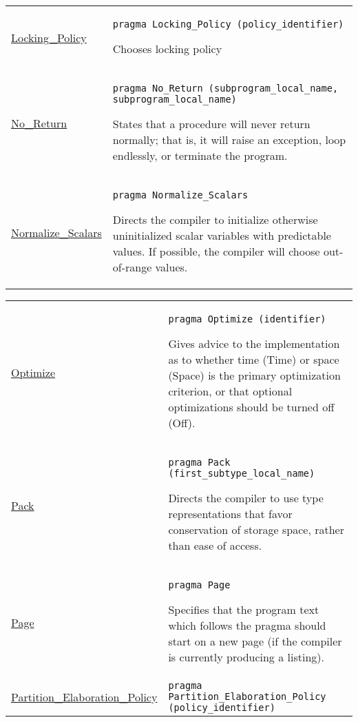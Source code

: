 \documentclass[english]{article}
\begin{document}
\begin{scriptsize}
\begin{multicols*}{3}
\begin{tabular}{@{}p{2cm}p{6.5cm}}
   \href{http://www.ada-auth.org/standards/22rm/html/RM-D-3.html}{Locking\_Policy} & \texttt{pragma Locking\_Policy (policy\_identifier)}

   Chooses locking policy\\

   \href{http://www.ada-auth.org/standards/22rm/html/RM-J-15-2.html}{No\_Return} & \texttt{pragma No\_Return (subprogram\_local\_name{, subprogram\_local\_name})}

States that a procedure will never return normally; that is, it will raise an exception, loop endlessly, or terminate the program.\\


\href{http://www.ada-auth.org/standards/22rm/html/RM-H-1.html}{Normalize\_Scalars} & \texttt{pragma Normalize\_Scalars}

Directs the compiler to initialize otherwise uninitialized scalar variables with predictable values. If possible, the compiler will choose out-of-range values.\\

\end{tabular}
\begin{tabular}{@{}p{2cm}p{6.5cm}}

\href{http://www.ada-auth.org/standards/22rm/html/RM-2-8.html}{Optimize} & \texttt{pragma Optimize (identifier)}

Gives advice to the implementation as to whether time (Time) or space (Space) is the primary optimization criterion, or that optional optimizations should be turned off (Off).\\

\href{http://www.ada-auth.org/standards/22rm/html/RM-J-15-3.html}{Pack} & \texttt{pragma Pack (first\_subtype\_local\_name)}

Directs the compiler to use type representations that favor conservation of storage space, rather than ease of access.\\

\href{http://www.ada-auth.org/standards/22rm/html/RM-2-8.html}{Page} & \texttt{pragma Page}

Specifies that the program text which follows the pragma should start on a new page (if the compiler is currently producing a listing).\\

\href{http://www.ada-auth.org/standards/22rm/html/RM-H-6.html}{Partition\_Elaboration\_Policy} & \texttt{pragma Partition\_Elaboration\_Policy (policy\_identifier)}


\end{tabular}
\end{multicols*}
\end{scriptsize}
\end{document}
